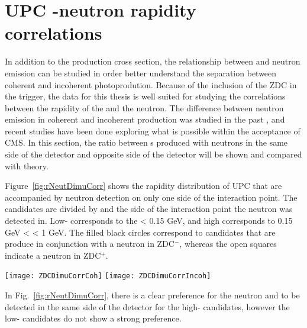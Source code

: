   \section{UPC \JPsi{}-neutron rapidity correlations~\label{sec:upcCor}}
    In addition to the production cross section, the relationship between 
      \JPsi{} and neutron emission can be studied in order better understand
      the separation between coherent and incoherent photoprodution. 
    Because of the inclusion of the ZDC in the trigger, the data for this 
      thesis is well suited for studying the correlations between the 
      rapidity of the \JPsi{} and the neutron. 
    The difference between neutron emission in coherent and incoherent 
      production was studied in the past \cite{Strikman:2005ze}, and recent
      studies have been done exploring what is possible within the acceptance
      of CMS. 
    In this section, the ratio between \JPsi{}s produced with neutrons in the 
      same side of the detector and opposite side of the detector will be shown
      and compared with theory. 

    Figure~\ref{fig:rNeutDimuCorr} shows the rapidity distribution of UPC 
      \JPsi{} that are accompanied by neutron detection on only one side of the
      interaction point. 
    The candidates are divided by \pt{} and the side of the interaction point
      the neutron was detected in. 
    Low-\pt{} corresponds to the \pt{} < 0.15 GeV, and high \pt{} corresponds
      to 0.15 GeV < \pt < 1 GeV.
    The filled black circles correspond to candidates that are produce in 
      conjunction with a neutron in ZDC$^{-}$, whereas the open squares 
      indicate a neutron in ZDC$^{+}$.
    \begin{figure*}[!Hhtb]
      \begin{center}
        \texttt{[image: ZDCDimuCorrCoh]}
        \texttt{[image: ZDCDimuCorrIncoh]}
        \caption{\label{fig:rNeutDimuCorr}Rapidity distribution of \JPsi{} in the
          case of the events having the neutron in negative and positive rapidity 
          for the low-\pt{} \JPsi{} (left), high-\pt{} \JPsi{} (right) and dimuons from
          $\gamma \gamma$ sample (bottom). }
      \end{center}
    \end{figure*}
    In Fig.~\ref{fig:rNeutDimuCorr}, there is a clear preference for the 
      neutron and \JPsi{} to be detected in the same side of the detector for
      the high-\pt{} candidates, however the low-\pt{} candidates do not show
      a strong preference. 

